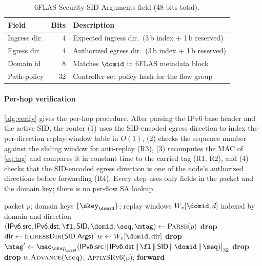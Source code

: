 \begin{table}[t]
\centering
\caption{6FLAS Security SID Arguments field (48 bits total).}
\label{tab:args}
\renewcommand{\arraystretch}{1.2}
\begin{tabular}{lrl}
\toprule
\textbf{Field} & \textbf{Bits} & \textbf{Description} \\
\midrule
Ingress dir.   & 4  & Expected ingress dir.\ (3\,b index + 1\,b reserved) \\
Egress dir.    & 4  & Authorized egress dir.\ (3\,b index + 1\,b reserved) \\
Domain id      & 8  & Matches $\domid$ in 6FLAS metadata block \\
Path-policy    & 32 & Controller-set policy hash for the flow group \\
\bottomrule
\end{tabular}
\end{table}

\paragraph{Per-hop verification}
\label{sec:perhop}
\cref{alg:verify} gives the per-hop procedure. After parsing the IPv6 base
header and the active SID, the router (1) uses the SID-encoded egress direction to index the per-direction replay-window table in $O(1)$,
(2) checks the sequence number against the sliding window for anti-replay (R3),
(3) recomputes the MAC of \cref{eq:tag} and compares it in constant time to the
carried tag (R1, R2), and (4) checks that the SID-encoded egress direction is
one of the node's authorized directions before forwarding (R4). Every step uses
only fields in the packet and the domain key; there is no per-flow SA lookup.

\begin{algorithm}[t]
\caption{6FLAS per-hop verification at router $v$}
\label{alg:verify}
\begin{algorithmic}[1]
\Require packet $p$; domain keys $\{\skey_\domid\}$; replay windows $W_v[\domid, d]$ indexed by domain and direction
\State $(\textsf{IPv6.src}, \textsf{IPv6.dst}, \fl,\textsf{SID},\domid,\seq,\mtag) \gets \textsc{Parse}(p)$
 \State \textbf{drop} \EndIf
\State $\text{dir} \gets \textsc{EgressDir}(\textsf{SID.Args})$ 
\State $w \gets W_v[\domid, \text{dir}]$ 
    \State \textbf{drop} 
\EndIf
\State $\mtag' \gets \mac_{\skey_\domid}(\textsf{IPv6.src} \,\|\, \textsf{IPv6.dst} \,\|\, \fl \,\|\, \textsf{SID} \,\|\, \domid \,\|\, \seq)\big|_{32}$
 \State \textbf{drop}  \EndIf
{}
    \State \textbf{drop} 
\EndIf
\State $w.\textsc{Advance}(\seq)$; \quad \textsc{ApplySRv6}(p); \quad \textbf{forward}
\end{algorithmic}
\end{algorithm}


